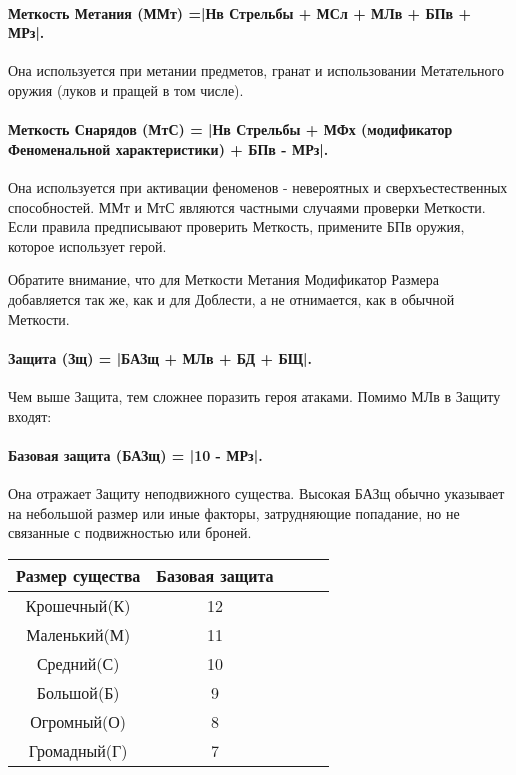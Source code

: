 \paragraph{Меткость Метания (ММт) =|Нв Стрельбы + МСл + МЛв + БПв + МРз|.} Она используется при метании предметов, гранат и использовании Метательного оружия (луков и пращей в том числе). 
\paragraph{Меткость Снарядов (МтС) = |Нв Стрельбы + МФх (модификатор Феноменальной характеристики) + БПв - МРз|.} Она используется при активации феноменов - невероятных и сверхъестественных способностей.
\newline ММт и МтС являются частными случаями проверки Меткости. Если правила предписывают проверить Меткость, примените БПв оружия, которое использует герой.
\begin{tcolorbox}
	Обратите внимание, что для Меткости Метания Модификатор Размера добавляется так же, как и для Доблести, а не отнимается, как в обычной Меткости.
\end{tcolorbox}
\paragraph{Защита (Зщ) = |БАЗщ + МЛв + БД + БЩ|.} Чем выше Защита, тем сложнее поразить героя атаками. Помимо МЛв в Защиту входят:
\paragraph{Базовая защита (БАЗщ) = |10 - МРз|.} Она отражает Защиту неподвижного существа. Высокая БАЗщ обычно указывает на небольшой размер или иные факторы, затрудняющие попадание, но не связанные с подвижностью или броней. 
\begin{center}
    \begin{tabular}{ |c|c|c|c|c| }
        \hline
        Размер существа & Базовая защита
        \\ \hline
        Крошечный(К) & 12
        \\ \hline
        Маленький(М) & 11
        \\ \hline
        Средний(С) & 10
        \\ \hline
        Большой(Б) & 9
        \\ \hline
        Огромный(О) & 8
        \\ \hline
        Громадный(Г) & 7
        \\ \hline
    \end{tabular}
\end{center}

